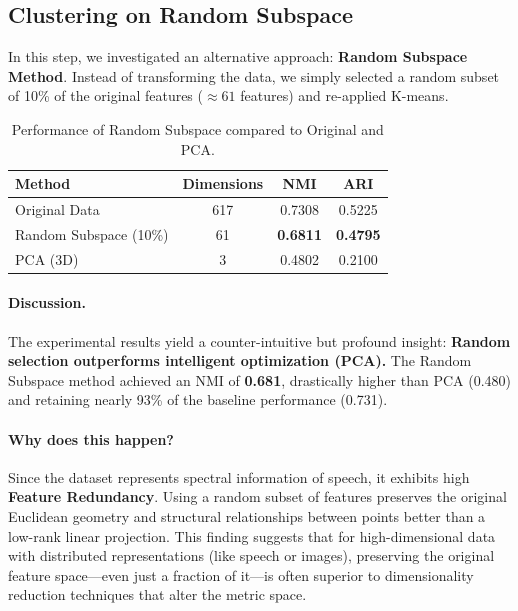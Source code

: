 \documentclass[12pt]{article}
\begin{document}
\subsection{Clustering on Random Subspace}
In this step, we investigated an alternative approach: \textbf{Random Subspace Method}. Instead of transforming the data, we simply selected a random subset of 10\% of the original features ($\approx 61$ features) and re-applied K-means.

\begin{table}[H]
\centering
\begin{tabular}{lccc}
\toprule
\textbf{Method} & \textbf{Dimensions} & \textbf{NMI} & \textbf{ARI} \\
\midrule
Original Data & 617 & 0.7308 & 0.5225 \\
Random Subspace (10\%) & 61 & \textbf{0.6811} & \textbf{0.4795} \\
PCA (3D) & 3 & 0.4802 & 0.2100 \\
\bottomrule
\end{tabular}
\caption{Performance of Random Subspace compared to Original and PCA.}
\label{tab:subspace_results}
\end{table}

\paragraph{Discussion.} 
The experimental results yield a counter-intuitive but profound insight: \textbf{Random selection outperforms intelligent optimization (PCA).} The Random Subspace method achieved an NMI of \textbf{0.681}, drastically higher than PCA (0.480) and retaining nearly 93\% of the baseline performance (0.731).

\paragraph{Why does this happen?}
Since the dataset represents spectral information of speech, it exhibits high \textbf{Feature Redundancy}. Using a random subset of features preserves the original Euclidean geometry and structural relationships between points better than a low-rank linear projection. This finding suggests that for high-dimensional data with distributed representations (like speech or images), preserving the original feature space—even just a fraction of it—is often superior to dimensionality reduction techniques that alter the metric space.
\end{document}
